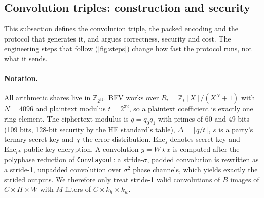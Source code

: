 \subsection{Convolution triples: construction and security}\label{sec:heformal}

This subsection defines the convolution triple, the packed encoding and the protocol that generates it, and argues
correctness, security and cost. The engineering steps that follow (\cref{fig:steps}) change how fast the
protocol runs, not what it sends.

\paragraph{Notation.} All arithmetic shares live in $\mathbb{Z}_{2^{32}}$. BFV works over
$R_t = \mathbb{Z}_t[X]/(X^N+1)$ with $N = 4096$ and plaintext modulus $t = 2^{32}$, so a plaintext coefficient
is exactly one ring element. The ciphertext modulus is $q = q_0 q_1$ with primes of 60 and 49 bits
(109 bits, 128-bit security by the HE standard's table), $\Delta = \lfloor q/t\rfloor$, $s$ is a party's
ternary secret key and $\chi$ the error distribution. $\mathrm{Enc}_s$ denotes secret-key and
$\mathrm{Enc}_{\mathit{pk}}$ public-key encryption. A convolution $y = W \star x$ is computed after the
polyphase reduction of \texttt{ConvLayout}: a stride-$\sigma$, padded convolution is rewritten as a stride-1,
unpadded convolution over $\sigma^2$ phase channels, which yields exactly the strided outputs. We therefore only
treat stride-1 valid convolutions of $B$ images of $C \times H \times W$ with $M$ filters of
$C \times k_h \times k_w$.

